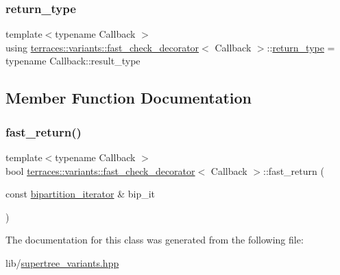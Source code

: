 \subsubsection{\texorpdfstring{return\+\_\+type}{return\_type}}
{\footnotesize\ttfamily template$<$typename Callback $>$ \\
using \hyperlink{classterraces_1_1variants_1_1fast__check__decorator}{terraces\+::variants\+::fast\+\_\+check\+\_\+decorator}$<$ Callback $>$\+::\hyperlink{classterraces_1_1variants_1_1fast__check__decorator_ae6258cfecb5cea22cf0a30ab3c0bbfe9}{return\+\_\+type} =  typename Callback\+::result\+\_\+type}



\subsection{Member Function Documentation}
\mbox{\label{classterraces_1_1variants_1_1fast__check__decorator_afc5fc595fa03aa85ed65a3741c5a97c0}} 
\subsubsection{\texorpdfstring{fast\+\_\+return()}{fast\_return()}}
{\footnotesize\ttfamily template$<$typename Callback $>$ \\
bool \hyperlink{classterraces_1_1variants_1_1fast__check__decorator}{terraces\+::variants\+::fast\+\_\+check\+\_\+decorator}$<$ Callback $>$\+::fast\+\_\+return (\begin{DoxyParamCaption}\item[{const \hyperlink{classterraces_1_1bipartition__iterator}{bipartition\+\_\+iterator} \&}]{bip\+\_\+it }\end{DoxyParamCaption})\hspace{0.3cm}{\ttfamily [inline]}}



The documentation for this class was generated from the following file\+:\begin{DoxyCompactItemize}
\item 
lib/\hyperlink{supertree__variants_8hpp}{supertree\+\_\+variants.\+hpp}\end{DoxyCompactItemize}
